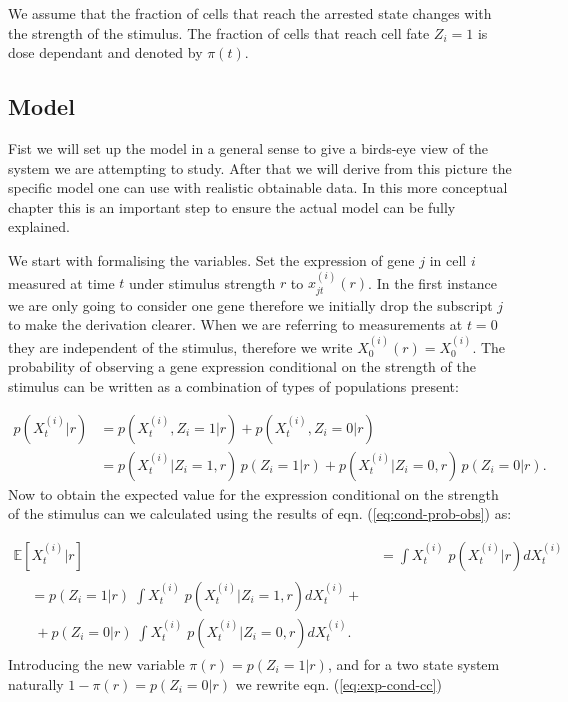 We assume that the fraction of cells that reach the arrested state changes with the strength of the stimulus. The fraction of cells that reach cell fate $Z_i = 1$ is dose dependant and denoted by $\pi(t)$.

\subsection{Model}
\label{sec:model-cell}

Fist we will set up the model in a general sense to give a birds-eye view of the system we are attempting to study. After that we will derive from this picture the specific model one can use with realistic obtainable data. In this more conceptual chapter this is an important step to ensure the actual model can be fully explained.

We start with formalising the variables. Set the expression of gene $j$ in cell $i$ measured at time $t $ under stimulus strength $r$ to $x_{jt}^{(i)}(r)$. In the first instance we are only going to consider one gene therefore we initially drop the subscript $j$ to make the derivation clearer. When we are referring to measurements at $t=0$ they are independent of the stimulus, therefore we write $X_0^{(i)}(r) = X_0^{(i)}$. The probability of observing a gene expression conditional on the strength of the stimulus can be written as a combination of types of populations present:

\begin{align}
  p(X_{t}^{(i)} | r) &= p(X_{t}^{(i)}, Z_i =1 | r) + p(X_{t}^{(i)}, Z_i =0 | r)\\
  &= p(X_{t}^{(i)}| Z_i =1,  r) \, p(Z_i =1 | r) + p(X_{t}^{(i)}| Z_i =0,  r) \, p(Z_i =0 | r).
  \label{eq:cond-prob-obs}
\end{align}
Now to obtain the expected value for the expression conditional on the strength of the stimulus can we calculated using the results of eqn. (\ref{eq:cond-prob-obs}) as:

\begin{align}
  \mathbb{E} [X_t^{(i)} | r] &= \int X_t^{(i)} \; p(X_t^{(i)}| r) dX_t^{(i)} \\
  \begin{split}
    &= p(Z_i = 1| r)\; \int X_t^{(i)} \; p(X_t^{(i)}|Z_i = 1, r) dX_t^{(i)} + \label{eq:exp-cond-cc} \\ 
    & \; + p(Z_i = 0| r)\; \int X_t^{(i)} \; p(X_t^{(i)}|Z_i = 0, r) dX_t^{(i)}.
  \end{split}
\end{align}
Introducing the new variable $\pi(r) = p(Z_i = 1 | r)$, and for a two state system naturally  $1 - \pi(r) = p(Z_i = 0 | r)$ we rewrite eqn. (\ref{eq:exp-cond-cc})

